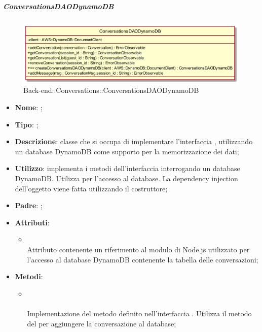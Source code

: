 \hypertarget{ConversationsDAODynamoDB_label}{\subparagraph{ConversationsDAODynamoDB}}
\begin{figure}[h]
	\centering
	\includegraphics[width=\textwidth,height=\textheight,keepaspectratio]{images/ClassConversationsDAODynamoDB.png}
	\caption{Back-end::Conversations::ConversationsDAODynamoDB}
\end{figure}
\begin{itemize}
	\item \textbf{Nome}: ;
	\item \textbf{Tipo}: ;
	\item \textbf{Descrizione}: classe che si occupa di implementare l'interfaccia , utilizzando un database DynamoDB come supporto per la memorizzazione dei dati;
	\item \textbf{Utilizzo}: implementa i metodi dell'interfaccia  interrogando un database DynamoDB. Utilizza  per l'accesso al database. La dependency injection dell'oggetto  viene fatta utilizzando il costruttore;
	\item \textbf{Padre}: ;
	\item \textbf{Attributi}:
	\begin{itemize}
		\item[]  \\
		Attributo contenente un riferimento al modulo di Node.js utilizzato per l'accesso al database DynamoDB contenente la tabella delle conversazioni;
	\end{itemize}
	\item \textbf{Metodi}:
	\begin{itemize}
		\item[]  \\\\		Implementazione del metodo definito nell'interfaccia . Utilizza il metodo  del  per aggiungere la conversazione al database;\\

\end{itemize}
\end{itemize}
